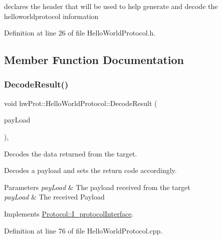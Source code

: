 declares the header that will be used to help generate and decode the helloworldprotocol information 

Definition at line 26 of file Hello\+World\+Protocol.\+h.



\subsection{Member Function Documentation}
\mbox{\label{classhwProt_1_1HelloWorldProtocol_a5182e4999269d9f6bf0da6274757c275}} 
\subsubsection{\texorpdfstring{DecodeResult()}{DecodeResult()}}
{\footnotesize\ttfamily void hw\+Prot\+::\+Hello\+World\+Protocol\+::\+Decode\+Result (\begin{DoxyParamCaption}\item[{std\+::shared\+\_\+ptr$<$ \mbox{\hyperlink{structProtocol_1_1DataStruct}{Protocol\+::\+Data\+Struct}} $>$}]{pay\+Load }\end{DoxyParamCaption})\hspace{0.3cm}{\ttfamily [override]}, {\ttfamily [virtual]}}



Decodes the data returned from the target. 

Decodes a payload and sets the return code accordingly.


\begin{DoxyParams}{Parameters}
{\em pay\+Load} & The payload received from the target\\
\hline
{\em pay\+Load} & The received Payload \\
\hline
\end{DoxyParams}


Implements \mbox{\hyperlink{classProtocol_1_1I__protocolInterface_a49178196621b840100cb08cc86f3c122}{Protocol\+::\+I\+\_\+protocol\+Interface}}.



Definition at line 76 of file Hello\+World\+Protocol.\+cpp.

\mbox{\label{classhwProt_1_1HelloWorldProtocol_a2af49345e67a98301465ffb2743b6177}} 
